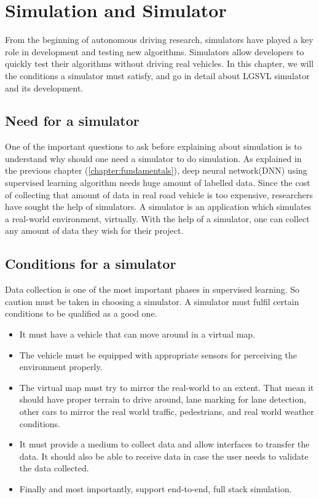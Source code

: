 \chapter{Simulation and Simulator}
From the beginning of autonomous driving research, simulators have played a key role in
development and testing new algorithms. Simulators allow developers to quickly test their
algorithms without driving real vehicles. In this chapter, we will the conditions a
simulator must satisfy, and go in detail about LGSVL simulator and its development.
\section{Need for a simulator}
One of the important questions to ask before explaining about simulation is to understand
why should one need a simulator to do simulation. As explained in the previous chapter
(\ref{chapter:fundamentals}), deep neural network(DNN) using supervised learning algorithm
needs huge amount of labelled data. Since the cost of collecting that amount of data in
real road vehicle is too expensive, researchers have sought the help of simulators. A
simulator is an application which simulates a real-world environment, virtually. With the
help of a simulator, one can collect any amount of data they wish for their project.

\section{Conditions for a simulator}

Data collection is one of the most important phases in supervised learning. So caution must
be taken in choosing a simulator. A simulator must fulfil certain conditions to be
qualified as a good one.
\begin{itemize}
    \item It must have a vehicle that can move around in a virtual map.
    \item The vehicle must be equipped with appropriate sensors for perceiving the
        environment properly.
    \item The virtual map must try to mirror the real-world to an extent. That mean it
        should have proper terrain to drive around, lane marking for lane detection, other
        cars to mirror the real world traffic, pedestrians, and real world weather
        conditions.
    \item It must provide a medium to collect data and allow interfaces to transfer the
        data. It should also be able to receive data in case the user needs to validate
        the data collected.
    \item Finally and most importantly, support end-to-end, full stack simulation.
\end{itemize}

